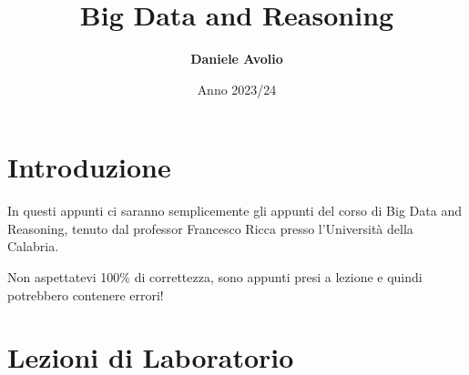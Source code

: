 \documentclass{article}
\title{\color{custompurple}\Huge Big Data and Reasoning}
\author{\textbf{Daniele Avolio}}
\date{Anno 2023/24}
\begin{document}
\maketitle
\newpage

\tableofcontents
\newpage
\section{Introduzione}
In questi appunti ci saranno semplicemente gli appunti del corso di Big Data and Reasoning, tenuto dal professor Francesco Ricca presso l'Università della Calabria.

Non aspettatevi 100\% di correttezza, sono appunti presi a lezione e quindi potrebbero contenere errori!


\newpage

\newpage
\section{Lezioni di Laboratorio}
\end{document}
